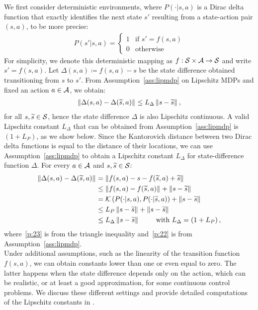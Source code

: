 \newline
We first consider deterministic environments, where $P(\cdot|s, a)$ is a Dirac delta function that exactly identifies the next state $s'$ resulting from a state-action pair $(s,a)$, to be more precise:
\begin{align}
P(s'|s,a)= 
\begin{cases}
1 & \text{if } s'=f(s,a)\\
0 & \text{otherwise}
\end{cases}
\end{align}
For simplicity, we denote this deterministic mapping as $f:\mathcal{S}\times\mathcal{A}\to\mathcal{S}$ and write $s'=f(s,a)$.
Let $\Delta(s, a) \coloneqq f(s,a) - s$ be the state difference obtained transitioning from $s$ to $s'$. From Assumption~\ref{ass:lipmdp} on Lipschitz \ac{MDPs} and fixed an action $a\in\mathcal{A}$, we obtain:
%
\begin{align}\label{eq:deltas}
\left\|\Delta (s, a) - \Delta (\widetilde{s}, a)\right\|_{} \leq L_{\Delta}\left\|s - \widetilde{s}\right\|_{},
\end{align}
%
for all $s,\widetilde{s}\in\mathcal{S}$, hence the state difference $\Delta$ is also Lipschitz continuous. A valid Lipschitz constant $L_{\Delta}$ that can be obtained from Assumption~\ref{ass:lipmdp} is $(1+L_{P})$, as we show below. Since the Kantorovich distance between two Dirac delta functions is equal to the distance of their locations, we can use Assumption~\ref{ass:lipmdp} to obtain a Lipschitz constant $L_{\Delta}$ for state-difference function $\Delta$. For every $a\in\mathcal{A}$ and $s,\widetilde{s}\in\mathcal{S}$:
\begin{align}
\left\|\Delta(s,a)-\Delta(\widetilde{s},a)\right\|_{} &=
\left\|f(s,a) - s - f(\widetilde{s},a) + \widetilde{s}\right\|_{} \nonumber\\
&\leq \left\|f(s,a)-f(\widetilde{s},a)\right\|_{} + \left\|s-\widetilde{s}\right\|_{} \label{p:23}\\
&= \mathcal{K}\left(P(\cdot|s,a), P(\cdot| \widetilde{s},a)\right) + \left\|s-\widetilde{s}\right\|_{} \nonumber\\
&\leq L_{P}\left\|s-\widetilde{s}\right\|_{} + \left\|s-\widetilde{s}\right\|_{} \label{p:22}\\
&\leq L_{\Delta} \left\|s-\widetilde{s}\right\|_{} \qquad \text{ with } L_{\Delta} = \left(1 + L_{P}\right), \label{p:18}
\end{align}
where~\eqref{p:23} is from the triangle inequality and~\eqref{p:22} is from Assumption~\ref{ass:lipmdp}.\\
\newline
Under additional assumptions, such as the linearity of the transition function $f(s,a)$, we can obtain constants lower than one or even equal to zero. The latter happens when the state difference depends only on the action, which can be realistic, or at least a good approximation, for some continuous control problems. We discuss these different settings and provide detailed computations of the Lipschitz constants in .
